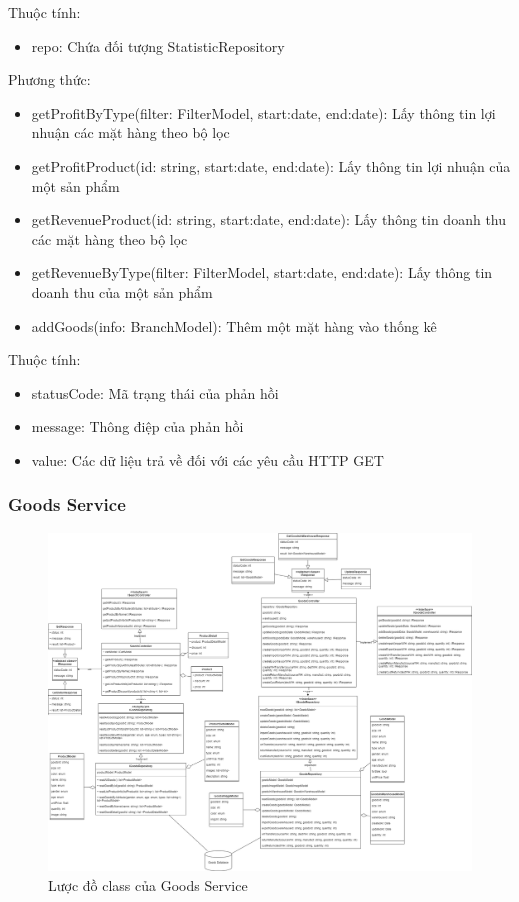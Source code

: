 Thuộc tính:
\begin{itemize}
	\item repo: Chứa đối tượng StatisticRepository
\end{itemize}
Phương thức:
\begin{itemize}
	\item getProfitByType(filter: FilterModel, start:date,
	end:date): Lấy thông tin lợi nhuận các mặt hàng theo bộ lọc
	\item getProfitProduct(id: string, start:date,
	end:date): Lấy thông tin lợi nhuận của một sản phẩm
	\item getRevenueProduct(id: string, start:date,
	end:date): Lấy thông tin doanh thu các mặt hàng theo bộ lọc
	\item getRevenueByType(filter: FilterModel, start:date,
	end:date): Lấy thông tin doanh thu của một sản phẩm
	\item addGoods(info: BranchModel): Thêm một mặt hàng vào thống kê
\end{itemize}

Thuộc tính:
\begin{itemize}
	\item statusCode: Mã trạng thái của phản hồi
	\item message: Thông điệp của phản hồi
	\item value: Các dữ liệu trả về đối với các yêu cầu HTTP GET
\end{itemize}



\subsubsection{Goods Service}
\begin{figure}[!htp]
	\centering
	\includegraphics[width=17cm]{img/Architecture/service/GoodsService.png}
	\newline
	\caption{Lược đồ class của Goods Service}
\end{figure}



